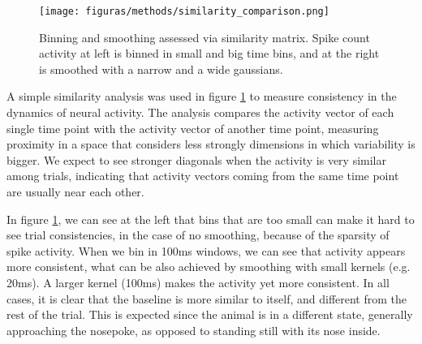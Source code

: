 \begin{figure}
    \centering
    \texttt{[image: figuras/methods/similarity\_comparison.png]}
    \caption[Binning and smoothing assessed via similarity matrix]{Binning and smoothing assessed via similarity matrix. Spike count activity at left is binned in small and big time bins, and at the right is smoothed with a narrow and a wide gaussians.}
    \label{fig:mahalanobis_smoothing} 
\end{figure} %

A simple similarity analysis was used in figure \ref{fig:mahalanobis_smoothing} to measure consistency in the dynamics of neural activity. The analysis compares the activity vector of each single time point with the activity vector of another time point, measuring proximity in a space that considers less strongly dimensions in which variability is bigger. We expect to see stronger diagonals when the activity is very similar among trials, indicating that activity vectors coming from the same time point are usually near each other.

In figure \ref{fig:mahalanobis_smoothing}, we can see at the left that bins that are too small can make it hard to see trial consistencies, in the case of no smoothing, because of the sparsity of spike activity. When we bin in 100ms windows, we can see that activity appears more consistent, what can be also achieved by smoothing with small kernels (e.g. 20ms). A larger kernel (100ms) makes the activity yet more consistent. 
In all cases, it is clear that the baseline is more similar to itself, and different from the rest of the trial. This is expected since the animal is in a different state, generally approaching the nosepoke, as opposed to standing still with its nose inside. 